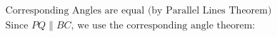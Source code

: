 \documentclass[preview]{standalone}
\begin{document}
\begin{align*}
\text{Corresponding Angles are equal (by Parallel Lines Theorem)}\\ \text{Since } PQ \parallel BC \text{, we use the corresponding angle theorem: }
\end{align*}
\end{document}
